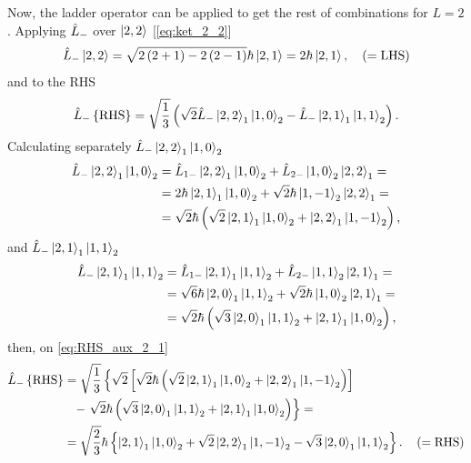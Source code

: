 Now, the ladder operator can be applied to get the rest of combinations for $L=2$.
Applying $\hat{L}_{-}$ over $\Ket{2,2}$ [\cref{eq:ket_2_2}]
\begin{equation}\label{eq:LHS_2_2}
    \hat{L}_{-} \Ket{2,2} = 
    \sqrt{2\left( 2 + 1 \right) - 2\left( 2 - 1 \right)} \hbar \Ket{2,1} =
    2 \hbar \Ket{2,1}, 
    \quad \left( =\text{LHS} \right)
\end{equation}
and to the RHS 
\begin{equation}\label{eq:RHS_aux_2_1}
    \hat{L}_{-} \left\{ \text{RHS} \right\} =
    \sqrt{\frac{1}{3}} \left( \sqrt{2} \hat{L}_{-} \Ket{2,2}_1 \Ket{1,0}_2 - \hat{L}_{-} \Ket{2,1}_1 \Ket{1,1}_2 \right).
\end{equation}
Calculating separately $\hat{L}_{-} \Ket{2,2}_1 \Ket{1,0}_2$
\begin{align}
    \notag \hat{L}_{-} \Ket{2,2}_1 \Ket{1,0}_2 &= \hat{L}_{1-} \Ket{2,2}_1 \Ket{1,0}_2 + \hat{L}_{2-} \Ket{1,0}_2 \Ket{2,2}_1 = \\
    \notag &= 2 \hbar \Ket{2,1}_1 \Ket{1,0}_2 + \sqrt{2} \hbar \Ket{1,-1}_2 \Ket{2,2}_1 = \\
           &= \sqrt{2} \hbar \left( \sqrt{2} \Ket{2,1}_1 \Ket{1,0}_2 + \Ket{2,2}_1 \Ket{1,-1}_2 \right),
\end{align}
and $\hat{L}_{-} \Ket{2,1}_1 \Ket{1,1}_2$
\begin{align}
    \notag \hat{L}_{-} \Ket{2,1}_1 \Ket{1,1}_2 &= \hat{L}_{1-} \Ket{2,1}_1 \Ket{1,1}_2 + \hat{L}_{2-} \Ket{1,1}_2 \Ket{2,1}_1 = \\
    \notag &= \sqrt{6} \hbar \Ket{2,0}_1 \Ket{1,1}_2 + \sqrt{2} \hbar \Ket{1,0}_2 \Ket{2,1}_1 = \\
           &= \sqrt{2} \hbar \left( \sqrt{3} \Ket{2,0}_1 \Ket{1,1}_2 + \Ket{2,1}_1 \Ket{1,0}_2 \right),
\end{align}
then, on \cref{eq:RHS_aux_2_1}
\begin{align}\label{eq:RHS_2_2}
    \notag \hat{L}_{-} \left\{ \text{RHS} \right\} &=
    \sqrt{\frac{1}{3}} \left\{ 
        \sqrt{2} \left[
            \sqrt{2} \hbar \left( \sqrt{2} \Ket{2,1}_1 \Ket{1,0}_2 + \Ket{2,2}_1 \Ket{1,-1}_2 \right)
        \right]
    \right. \\
    \notag & \phantom{=} - \left. 
        \sqrt{2} \hbar \left( \sqrt{3} \Ket{2,0}_1 \Ket{1,1}_2 + \Ket{2,1}_1 \Ket{1,0}_2 \right)
    \right\} = \\
    &= 
    \sqrt{\frac{2}{3}} \hbar \left\{ 
        \Ket{2,1}_1 \Ket{1,0}_2 + \sqrt{2} \Ket{2,2}_1 \Ket{1,-1}_2
        - \sqrt{3} \Ket{2,0}_1 \Ket{1,1}_2
    \right\}.
    \quad \left( =\text{RHS} \right)
\end{align}

